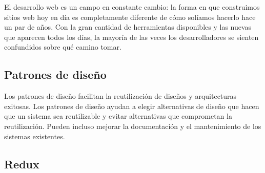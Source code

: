 El desarrollo web es un campo en constante cambio: la forma en que construimos sitios web hoy en día es completamente diferente de cómo solíamos hacerlo hace un par de años. Con la gran cantidad de herramientas disponibles y las nuevas que aparecen todos los días, la mayoría de las veces los desarrolladores se sienten confundidos sobre qué camino tomar.

\subsection{Patrones de diseño}
Los patrones de diseño facilitan la reutilización de diseños y arquitecturas exitosas. Los patrones de diseño ayudan a elegir alternativas de diseño que hacen que un sistema sea reutilizable y evitar alternativas que comprometan la reutilización. Pueden incluso mejorar la documentación y el mantenimiento de los sistemas existentes.

\subsection{Redux}
